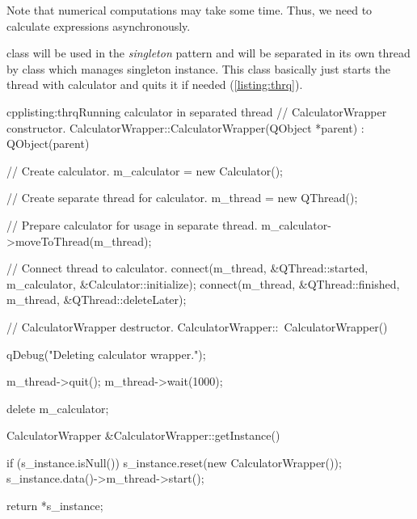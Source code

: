 Note that numerical computations may take some time. Thus, we need to calculate expressions asynchronously.

\indent{} class will be used in the \textit{singleton} pattern and will be separated in its own thread by class which manages singleton instance. This class basically just starts the thread with calculator and quits it if needed (\autoref{listing:thrq}).

\begin{fdoccode}{cpp}{listing:thrq}{Running calculator in separated thread}
// CalculatorWrapper constructor.
CalculatorWrapper::CalculatorWrapper(QObject *parent) : QObject(parent) {
  // Create calculator.
  m_calculator = new Calculator();

  // Create separate thread for calculator.
  m_thread = new QThread();

  // Prepare calculator for usage in separate thread.
  m_calculator->moveToThread(m_thread);

  // Connect thread to calculator.
  connect(m_thread, &QThread::started, m_calculator, &Calculator::initialize);
  connect(m_thread, &QThread::finished, m_thread, &QThread::deleteLater);
}

// CalculatorWrapper destructor.
CalculatorWrapper::~CalculatorWrapper() {
  qDebug("Deleting calculator wrapper.");

  m_thread->quit();
  m_thread->wait(1000);

  delete m_calculator;
}

CalculatorWrapper &CalculatorWrapper::getInstance() {
  if (s_instance.isNull()) {
    s_instance.reset(new CalculatorWrapper());
    s_instance.data()->m_thread->start();
  }

  return *s_instance;
}
\end{fdoccode}

